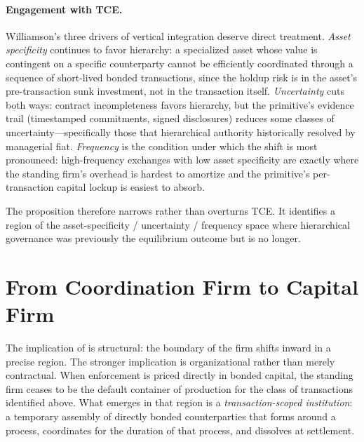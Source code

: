 \documentclass[11pt,a4paper]{article}
\theoremstyle{definition}
\theoremstyle{remark}
\begin{document}
\paragraph{Engagement with TCE.}
Williamson's three drivers of vertical integration deserve direct
treatment. \emph{Asset specificity} continues to favor hierarchy: a
specialized asset whose value is contingent on a specific
counterparty cannot be efficiently coordinated through a sequence of
short-lived bonded transactions, since the holdup risk is in the
asset's pre-transaction sunk investment, not in the transaction
itself. \emph{Uncertainty} cuts both ways: contract incompleteness
favors hierarchy, but the primitive's evidence trail
(timestamped commitments, signed disclosures) reduces some classes of
uncertainty---specifically those that hierarchical authority
historically resolved by managerial fiat. \emph{Frequency} is the
condition under which the shift is most pronounced: high-frequency
exchanges with low asset specificity are exactly where the standing
firm's overhead is hardest to amortize and the primitive's per-transaction
capital lockup is easiest to absorb.

The proposition therefore narrows rather than overturns TCE. It
identifies a region of the asset-specificity / uncertainty / frequency
space where hierarchical governance was previously the equilibrium
outcome but is no longer.

\section{From Coordination Firm to Capital Firm}
\label{sec:firm-types}

The implication of  is structural: the
boundary of the firm shifts inward in a precise region. The stronger
implication is organizational rather than merely contractual. When
enforcement is priced directly in bonded capital, the standing firm
ceases to be the default container of production for the class of
transactions identified above. What emerges in that region is a
\emph{transaction-scoped institution}: a temporary assembly of
directly bonded counterparties that forms around a process,
coordinates for the duration of that process, and dissolves at
settlement.
\end{document}
